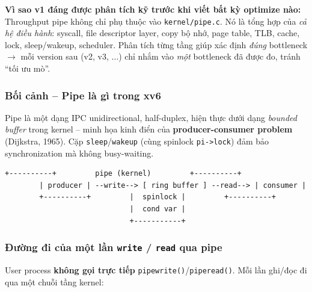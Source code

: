 \documentclass[11pt,a4paper]{article}
\begin{document}
\begin{callout}
\textbf{Vì sao v1 đáng được phân tích kỹ trước khi viết bất kỳ optimize nào:} Throughput pipe không chỉ phụ thuộc vào \texttt{kernel/pipe.c}. Nó là tổng hợp của \emph{cả hệ điều hành}: syscall, file descriptor layer, copy bộ nhớ, page table, TLB, cache, lock, sleep/wakeup, scheduler. Phân tích từng tầng giúp xác định \emph{đúng} bottleneck $\rightarrow$ mỗi version sau (v2, v3, $\ldots$) chỉ nhắm vào \emph{một} bottleneck đã được đo, tránh ``tối ưu mò''.
\end{callout}

\subsubsection{Bối cảnh -- Pipe là gì trong xv6}

Pipe là một dạng IPC unidirectional, half-duplex, hiện thực dưới dạng \emph{bounded buffer} trong kernel -- minh họa kinh điển của \textbf{producer-consumer problem} (Dijkstra, 1965). Cặp \texttt{sleep}/\texttt{wakeup} (cùng spinlock \texttt{pi->lock}) đảm bảo synchronization mà không busy-waiting.

\begin{lstlisting}[style=plain]
        +----------+         pipe (kernel)         +----------+
        | producer | --write--> [ ring buffer ] --read--> | consumer |
        +----------+         |  spinlock |         +----------+
                             |  cond var |
                             +-----------+
\end{lstlisting}

\subsubsection{Đường đi của một lần \texttt{write} / \texttt{read} qua pipe}

User process \textbf{không gọi trực tiếp} \texttt{pipewrite()}/\texttt{piperead()}. Mỗi lần ghi/đọc đi qua một chuỗi tầng kernel:
\end{document}
